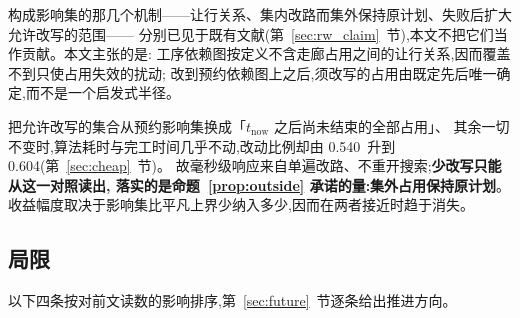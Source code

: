 \documentclass[manuscript,screen,review]{acmart}
\newcommand{\ResFracCheapRtwo}{0.540}
\newcommand{\ResFracAllFuture}{0.604}
\begin{document}
构成影响集的那几个机制——让行关系、集内改路而集外保持原计划、失败后扩大允许改写的范围——
分别已见于既有文献(第~\ref{sec:rw_claim}~节),本文不把它们当作贡献。本文主张的是:
工序依赖图按定义不含走廊占用之间的让行关系,因而覆盖不到只使占用失效的扰动;
改到预约依赖图上之后,须改写的占用由既定先后唯一确定,而不是一个启发式半径。

把允许改写的集合从预约影响集换成「\(t_{\mathrm{now}}\) 之后尚未结束的全部占用」、
其余一切不变时,算法耗时与完工时间几乎不动,改动比例却由 \ResFracCheapRtwo\ 升到
\ResFracAllFuture(第~\ref{sec:cheap}~节)。
故毫秒级响应来自单遍改路、不重开搜索;\textbf{少改写只能从这一对照读出,
落实的是命题~\ref{prop:outside} 承诺的量:集外占用保持原计划}。
收益幅度取决于影响集比平凡上界少纳入多少,因而在两者接近时趋于消失。

\subsection{局限}
\label{sec:limitations}

以下四条按对前文读数的影响排序,第~\ref{sec:future}~节逐条给出推进方向。
\end{document}
